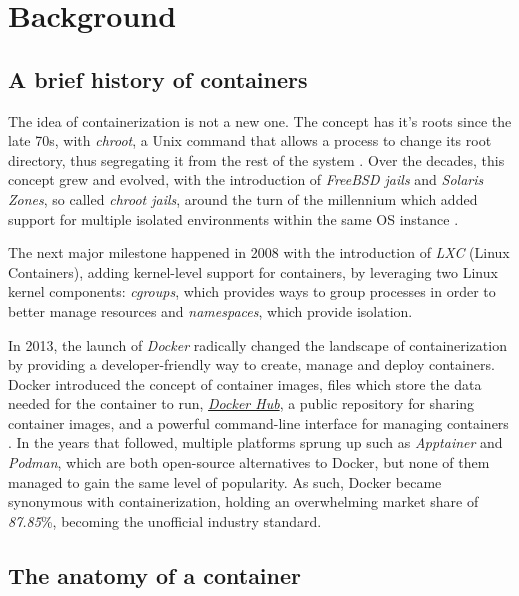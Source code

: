 \chapter{Background}
\label{chapter:background}

\section{A brief history of containers}
\label{sec:history}
The idea of containerization is not a new one. The concept has it's roots
since the late 70s, with \textit{chroot}, a Unix command that allows a process to change its root directory,
thus segregating it from the rest of the system \cite{history-of-containers}. Over the decades, this concept grew and evolved, with the introduction
of \textit{FreeBSD jails} and \textit{Solaris Zones}, so called \textit{chroot jails}, around the turn of the millennium which added support for multiple
isolated environments within the same OS instance \cite{history-of-containers}. 

The next major milestone happened in 2008 with the introduction of \textit{LXC} (Linux Containers),
adding kernel-level support for containers, by leveraging two Linux kernel components: \textit{cgroups}, which
provides ways to group processes in order to better manage resources and \textit{namespaces}, which provide isolation.\cite{history-of-containers}

In 2013, the launch of \textit{Docker} radically changed the landscape of containerization by providing a developer-friendly way to 
create, manage and deploy containers. Docker introduced the concept of container images, files which store the data needed for the container to run, 
\href{https://hub.docker.com/}{\textit{Docker Hub}}, a public repository for sharing container images, and a powerful command-line interface for managing containers \cite{history-of-containers}.
In the years that followed, multiple platforms sprung up such as \textit{Apptainer} and \textit{Podman}, which are both open-source alternatives to Docker, but none of them managed to gain the same level of popularity.
As such, Docker became synonymous with containerization, holding an overwhelming market share of \textit{87.85}\%\cite{docker-market-share}, becoming the unofficial industry standard.

\section{The anatomy of a container}
\label{sec:anatomy}


